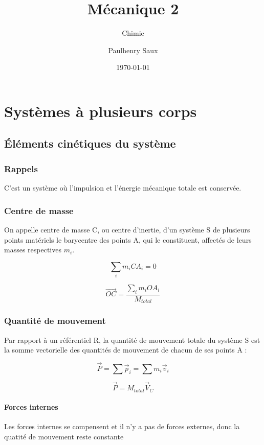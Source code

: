 \documentclass[french]{yLectureNote}
\title{Mécanique 2}
\subtitle{Chimie}
\author{Paulhenry Saux}
\date{\today}
\renewcommand{\vec}{\overrightarrow}
\newcommand{\dd}{\mathrm{d}}
\begin{document}
\setcounter{chapter}{3}
\chapter{Systèmes à plusieurs corps}
\section{Éléments cinétiques du système}
\subsection{Rappels}
\begin{definition}
C'est un système où l'impulsion et l'énergie mécanique totale est conservée.
\end{definition}
\subsection{Centre de masse}
On appelle centre de masse C, ou centre d'inertie, d'un système S de plusieurs points matériels le barycentre des points A, qui le constituent, affectés de leurs masses respectives \(m_i\).
\begin{proposition}
\[\sum_i m_iCA_i = 0\]
\end{proposition}
\begin{theorem}
 \[\vec{OC} = \frac{\sum_i m_i OA_i}{M_{total}}\]
\end{theorem}
\subsection{Quantité de mouvement}
Par rapport à un référentiel R, la quantité de mouvement totale du système S est la somme vectorielle des quantités de mouvement de chacun de ses points A :
\begin{theorem}
 \[\vec{P} = \sum\vec{p}_i = \sum m_i \vec{v}_i\]
\end{theorem}
\begin{proposition}
\[\vec{P} = M_{total}\vec{V}_C\]
\end{proposition}
\subsubsection{Forces internes}
\begin{proposition}
Les forces internes se compensent et il n'y a pas de forces externes, donc la quatité de mouvement reste constante
\end{proposition}
\end{document}
